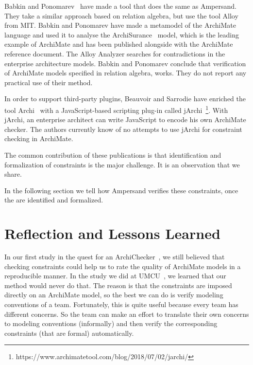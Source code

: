 \documentclass[sn-vancouver]{sn-jnl}%
\begin{document}
Babkin and Ponomarev~\cite{babkin2017analysis} have made a tool that does the same as Ampersand.
They take a similar approach based on relation algebra, but use the tool Alloy~\cite{Alloy2006} from MIT.
Babkin and Ponomarev have made a metamodel of the ArchiMate language and used it to analyse the ArchiSurance~\cite{ArchiSurance2016} model,
which is the leading example of ArchiMate and has been published alongside with the ArchiMate reference document.
The Alloy Analyzer searches for contradictions in the enterprise architecture models.
Babkin and Ponomarev conclude that verification of ArchiMate models specified in relation algebra, works.
They do not report any practical use of their method.

In order to support third-party plugins,
Beauvoir and Sarrodie have enriched the tool Archi~\cite{Archi} with a JavaScript-based scripting plug-in called jArchi~\footnote{https://www.archimatetool.com/blog/2018/07/02/jarchi/}.
With jArchi, an enterprise architect can write JavaScript to encode his own ArchiMate checker.
The authors currently know of no attempts to use jArchi for constraint checking in ArchiMate.

The common contribution of these publications is that identification and formalization of constraints is the major challenge.
It is an observation that we share.

In the following section we tell how Ampersand verifies these constraints,
once the are identified and formalized.

\section{Reflection and Lessons Learned}\label{reflection}
In our first study in the quest for an ArchiChecker~\cite{filetenterprise},
we still believed that checking constraints could help us to rate the quality of ArchiMate models in a reproducible manner.
In the study we did at UMCU~\cite{iceis22}, we learned that our method would never do that.
The reason is that the constraints are imposed directly on an ArchiMate model, so the best we can do is verify modeling conventions of a team.
Fortunately, this is quite useful because every team has different concerns.
So the team can make an effort to translate their own concerns to modeling conventions (informally)
and then verify the corresponding constraints (that are formal) automatically.
\end{document}
